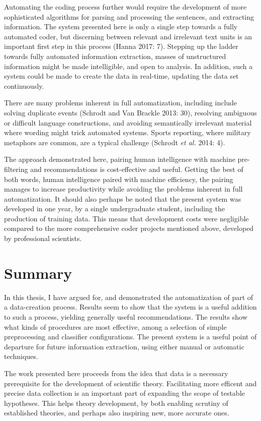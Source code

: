 \documentclass[12pt,twoside]{reedthesis}
\begin{document}
Automating the coding process further would require the development of
more sophisticated algorithms for parsing and processing the sentences,
and extracting information. The system presented here is only a single
step towards a fully automated coder, but discerning between relevant
and irrelevant text units is an important first step in this process
(Hanna 2017: 7). Stepping up the ladder towards fully automated
information extraction, masses of unstructured information might be made
intelligible, and open to analysis. In addition, such a system could be
made to create the data in real-time, updating the data set
continuously.

There are many problems inherent in full automatization, including
include solving duplicate events (Schrodt and Van Brackle 2013: 30),
resolving ambiguous or difficult language constructions, and avoiding
semantically irrelevant material where wording might trick automated
systems. Sports reporting, where military metaphors are common, are a
typical challenge (Schrodt \emph{et al.} 2014: 4).

The approach demonstrated here, pairing human intelligence with machine
pre-filtering and recommendations is cost-effective and useful. Getting
the best of both words, human intelligence paired with machine
efficiency, the pairing manages to increase productivity while avoiding
the problems inherent in full automatization. It should also perhaps be
noted that the present system was developed in one year, by a single
undergraduate student, including the production of training data. This
means that development costs were negligible compared to the more
comprehensive coder projects mentioned above, developed by professional
scientists.

\chapter{Summary}\label{summary}

In this thesis, I have argued for, and demonstrated the automatization
of part of a data-creation process. Results seem to show that the system
is a useful addition to such a process, yielding generally useful
recommendations. The results show what kinds of procedures are most
effective, among a selection of simple preprocessing and classifier
configurations. The present system is a useful point of departure for
future information extraction, using either manual or automatic
techniques.

The work presented here proceeds from the idea that data is a necessary
prerequisite for the development of scientific theory. Facilitating more
efficent and precise data collection is an important part of expanding
the scope of testable hypotheses. This helps theory development, by both
enabling scrutiny of established theories, and perhaps also inspiring
new, more accurate ones.
\end{document}

